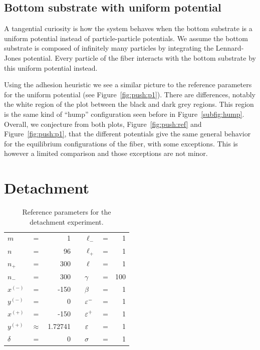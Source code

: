 \subsection{Bottom substrate with uniform potential} \label{section:compression:pressure}

A tangential curiosity is how the system behaves when the bottom substrate is a uniform potential instead of particle-particle potentials. We assume the bottom substrate is composed of infinitely many particles by integrating the Lennard-Jones potential. Every particle of the fiber interacts with the bottom substrate by this uniform potential instead.

Using the adhesion heuristic we see a similar picture to the reference parameters for the uniform potential (see Figure~\ref{fig:push:p1}). There are differences, notably the white region of the plot between the black and dark grey regions. This region is the same kind of ``hump'' configuration seen before in Figure~\ref{subfig:hump}. Overall, we conjecture from both plots, Figure~\ref{fig:push:ref} and Figure~\ref{fig:push:p1}, that the different potentials give the same general behavior for the equilibrium configurations of the fiber, with some exceptions. This is however a limited comparison and those exceptions are not minor.

\section{Detachment} \label{ch:detachment}

   \begin{table}[t]
      \centering
      \caption{Reference parameters for the detachment experiment. \label{table:detachment_reference}}
      \begin{tabular}{lcrclcr}
         $m$ & = & 1 & \hspace{1in} & $\ell_-$ & = & 1 \\
         $n$ & = & 96 & & $\ell_+$ & = & 1 \\
         $n_+$ & = & 300 & & $\ell$ & = & 1 \\
         $n_-$ & = & 300 & & $\gamma$ & = & 100 \\
         $x^{(-)}$ & = & -150 & & $\beta$ & = & 1 \\
         $y^{(-)}$ & = & 0 & & $\varepsilon^-$ & = & 1 \\
         $x^{(+)}$ & = & -150 & & $\varepsilon^+$ & = & 1 \\
         $y^{(+)}$ & $\approx$ & 1.72741 & & $\varepsilon$ & = & 1 \\
         $\delta$ & = & 0 & & $\sigma$ & = & 1
      \end{tabular}
   \end{table}

